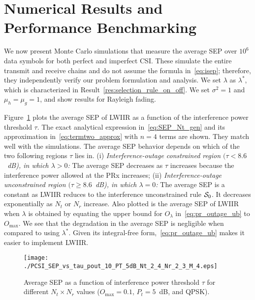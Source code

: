 \documentclass[journal]{IEEEtran}
\newcommand{\lam}{\lambda}
\newcommand{\lamstar}{\lam^{*}}
\newcommand{\mug}{{\mu_{g}}}
\newcommand{\muh}{{\mu_{h}}}
\newcommand{\Nt}{{N_t}}
\newcommand{\Nr}{{N_r}}
\newcommand{\Pt}{{P_t}}
\newcommand{\noisevar}{\sigma^2}
\newcommand{\outmax}{O_{\text{max}}}
\newcommand{\itau}{\tau}
\newcommand{\out}{O}
\newcommand{\caluncons}{{\cal S_{\text{0}}}}
\newcommand{\outlam}{\out_{\lam}}
\begin{document}
\section{Numerical Results and Performance Benchmarking}
\label{sec:results}
We now present Monte Carlo simulations that measure the average SEP over $10^6$ data symbols for both perfect and imperfect CSI. These simulate the entire transmit and receive chains and do not assume the formula in~\eqref{eq:isep}; therefore, they independently verify our problem formulation and analysis. We set $\lam$ as  $\lamstar$, which is characterized in Result~\ref{res:selection_rule_on_off}. We set $\noisevar =1$ and $\muh =\mug = 1$, and show results for Rayleigh fading. 

Figure~\ref{fig:SEP_vs_tau} plots the average SEP of LWIIR as a function of the interference power threshold $\itau$. The exact analytical expression in~\eqref{eq:SEP_Nt_gen} and its approximation in~\eqref{eq:termtwo_approx} with $n=4$ terms are shown. They match well with the simulations. The average SEP behavior depends on which of the two following regions $\itau$ lies in. (i) {\em Interference-outage constrained region $(\itau < 8.6$~dB), in which $\lam>0$:} The average SEP decreases as $\itau$ increases because the interference power allowed at the PRx increases; (ii) {\em Interference-outage unconstrained region $(\itau \geq 8.6$~dB), in which $\lam=0$:} The average SEP is a constant as LWIIR reduces to the interference unconstrained rule $\caluncons$. It decreases exponentially as $\Nt$ or $\Nr$ increase.  Also plotted is the average SEP of LWIIR when $\lam$ is obtained by equating the  upper bound for $\outlam$ in~\eqref{eq:pr_outage_ub} to  $\outmax$. We see that the degradation in the average SEP  is negligible when compared to using $\lam^*$. Given its integral-free form,~\eqref{eq:pr_outage_ub} makes it easier to implement LWIIR. 
%
\begin{figure}
  \centering \texttt{[image: ./PCSI\_SEP\_vs\_tau\_pout\_10\_PT\_5dB\_Nt\_2\_4\_Nr\_2\_3\_M\_4.eps]}
  \caption{Average SEP as a function of interference power threshold $\itau$ for different $\Nt \times \Nr$ values ($\outmax=0.1$,  $\Pt = 5$~dB, and QPSK).}
\label{fig:SEP_vs_tau}
\end{figure}
\end{document}
